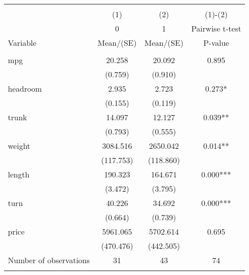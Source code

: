 
\begin{tabular}{@{\extracolsep{5pt}}lccc}
\\[-1.8ex]\hline \hline \\[-1.8ex]
 & \multicolumn{1}{c}{(1)}  & \multicolumn{1}{c}{(2)}  & \multicolumn{1}{c}{(1)-(2)} \\
 & \multicolumn{1}{c}{0}  & \multicolumn{1}{c}{1}  & \multicolumn{1}{c}{Pairwise t-test}  \\
Variable & Mean/(SE) & Mean/(SE) & P-value \\ \hline \\[-1.8ex] 
mpg   & 20.258    & 20.092    & 0.895   \\
 & (0.759)  & (0.910)  &   \\
headroom   & 2.935    & 2.723    & 0.273*   \\
 & (0.155)  & (0.119)  &   \\
trunk   & 14.097    & 12.127    & 0.039**   \\
 & (0.793)  & (0.555)  &   \\
weight   & 3084.516    & 2650.042    & 0.014**   \\
 & (117.753)  & (118.860)  &   \\
length   & 190.323    & 164.671    & 0.000***   \\
 & (3.472)  & (3.795)  &   \\
turn   & 40.226    & 34.692    & 0.000***   \\
 & (0.664)  & (0.739)  &   \\
price   & 5961.065    & 5702.614    & 0.695   \\
 & (470.476)  & (442.505)  &   \\
Number of observations  & 31   & 43  & 74   \\
\hline \\[-1.8ex]

\end{tabular}

